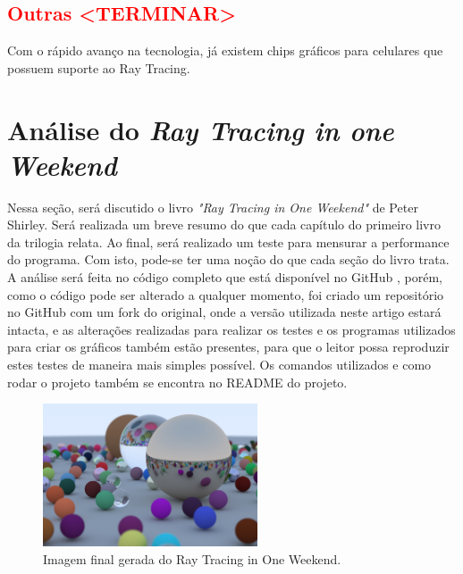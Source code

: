 \documentclass[journal]{IEEEtran}
\begin{document}
\subsection{\textcolor{red}{\textbf{Outras <TERMINAR>}}}
Com o rápido avanço na tecnologia, já existem chips gráficos para celulares que possuem suporte
ao Ray Tracing.


\section{Análise do \emph{Ray Tracing in one Weekend}}
Nessa seção, será discutido o livro \emph{"Ray Tracing in One Weekend"} de Peter Shirley. 
\cite{Shirley2020RTW1} Será realizada um breve resumo do que cada capítulo do primeiro
livro da trilogia relata. Ao final, será realizado um teste para mensurar a performance
do programa. Com isto, pode-se ter uma noção do que cada seção do livro trata. A análise 
será feita no código completo que está disponível no GitHub \cite{RayTracinOneWeekend-GitHub}, 
porém, como o código pode ser alterado a qualquer momento, foi criado um repositório no GitHub 
\cite{RayTracinOneWeekend-Artigo} com um fork
do original, onde a versão utilizada neste artigo estará intacta, e as alterações
realizadas para realizar os testes e os programas utilizados para criar os gráficos
também estão presentes, para que o leitor possa reproduzir estes testes de maneira
mais simples possível. Os comandos utilizados e como rodar o projeto também se 
encontra no README do projeto.

\begin{figure}[ht]
  \centering
  \includegraphics[width=2.5in]{media/rtiow-final.jpg}
  \caption{Imagem final gerada do Ray Tracing in One Weekend.}
  \label{img_rtiow_final}
\end{figure}
\end{document}
